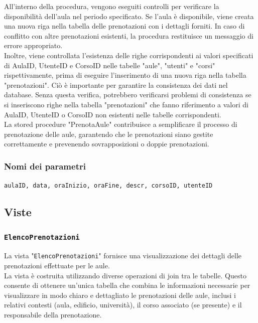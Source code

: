 \documentclass[a4paper, 10pt, oneside]{article} %
\begin{document}
All'interno della procedura, vengono eseguiti controlli per verificare la disponibilità dell'aula nel periodo specificato. Se l'aula è disponibile, viene creata una nuova riga nella tabella delle prenotazioni con i dettagli forniti. In caso di conflitto con altre prenotazioni esistenti, la procedura restituisce un messaggio di errore appropriato.\\

Inoltre, viene controllata l'esistenza delle righe corrispondenti ai valori specificati di AulaID, UtenteID e CorsoID nelle tabelle "aule", "utenti" e "corsi" rispettivamente, prima di eseguire l'inserimento di una nuova riga nella tabella "prenotazioni". Ciò è importante per garantire la consistenza dei dati nel database. Senza questa verifica, potrebbero verificarsi problemi di consistenza se si inseriscono righe nella tabella "prenotazioni" che fanno riferimento a valori di AulaID, UtenteID o CorsoID non esistenti nelle tabelle corrispondenti.\\

La stored procedure "PrenotaAule" contribuisce a semplificare il processo di prenotazione delle aule, garantendo che le prenotazioni siano gestite correttamente e prevenendo sovrapposizioni o doppie prenotazioni.

\subsubsection*{Nomi dei parametri}

\texttt{aulaID, data, oraInizio, oraFine, descr, corsoID, utenteID}


\subsection{Viste}

\subsubsection*{\texttt{ElencoPrenotazioni}}

La vista "\texttt{ElencoPrenotazioni}" fornisce una visualizzazione dei dettagli delle prenotazioni effettuate per le aule.\\

La vista è costruita utilizzando diverse operazioni di join tra le tabelle. Questo consente di ottenere un'unica tabella che combina le informazioni necessarie per visualizzare in modo chiaro e dettagliato le prenotazioni delle aule, inclusi i relativi contesti (aula, edificio, università), il corso associato (se presente) e il responsabile della prenotazione.
\end{document}
